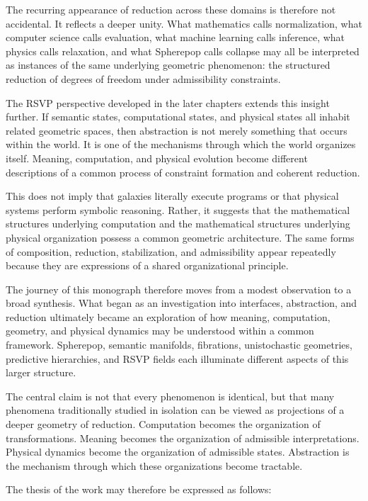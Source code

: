 \documentclass[12pt,letterpaper]{article}
\theoremstyle{remark}
\begin{document}
The recurring appearance of reduction across these domains is therefore not accidental. It reflects a deeper unity. What mathematics calls normalization, what computer science calls evaluation, what machine learning calls inference, what physics calls relaxation, and what Spherepop calls collapse may all be interpreted as instances of the same underlying geometric phenomenon: the structured reduction of degrees of freedom under admissibility constraints.

The RSVP perspective developed in the later chapters extends this insight further. If semantic states, computational states, and physical states all inhabit related geometric spaces, then abstraction is not merely something that occurs within the world. It is one of the mechanisms through which the world organizes itself. Meaning, computation, and physical evolution become different descriptions of a common process of constraint formation and coherent reduction.

This does not imply that galaxies literally execute programs or that physical systems perform symbolic reasoning. Rather, it suggests that the mathematical structures underlying computation and the mathematical structures underlying physical organization possess a common geometric architecture. The same forms of composition, reduction, stabilization, and admissibility appear repeatedly because they are expressions of a shared organizational principle.

The journey of this monograph therefore moves from a modest observation to a broad synthesis. What began as an investigation into interfaces, abstraction, and reduction ultimately became an exploration of how meaning, computation, geometry, and physical dynamics may be understood within a common framework. Spherepop, semantic manifolds, fibrations, unistochastic geometries, predictive hierarchies, and RSVP fields each illuminate different aspects of this larger structure.

The central claim is not that every phenomenon is identical, but that many phenomena traditionally studied in isolation can be viewed as projections of a deeper geometry of reduction. Computation becomes the organization of transformations. Meaning becomes the organization of admissible interpretations. Physical dynamics become the organization of admissible states. Abstraction is the mechanism through which these organizations become tractable.

The thesis of the work may therefore be expressed as follows:
\end{document}
